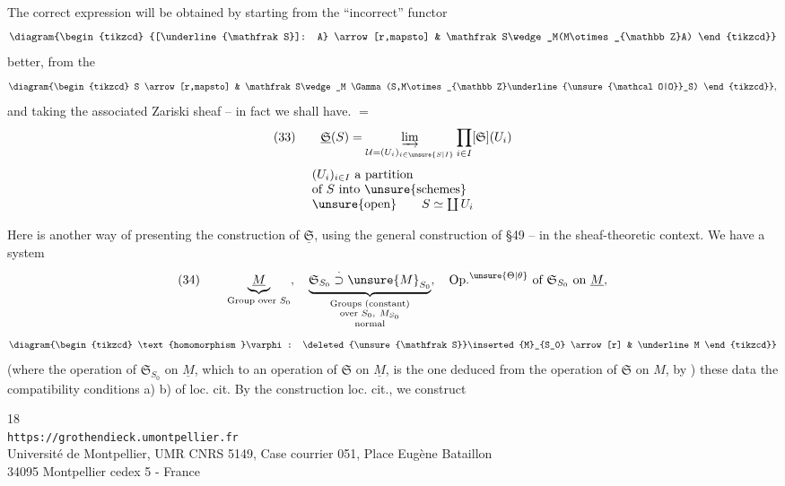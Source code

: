 The correct expression will be obtained by starting from the  ``incorrect'' functor
\[
\diagram{\begin{tikzcd}
{[\underline{\mathfrak S}]: A} \arrow[r,mapsto] &
\mathfrak S\wedge_M(M\otimes_{\mathbb Z}A)
\end{tikzcd}}
\]
 better, from the 
\[
\diagram{\begin{tikzcd}
S \arrow[r,mapsto] &
\mathfrak S\wedge_M
\Gamma(S,M\otimes_{\mathbb Z}\underline{\unsure{\mathcal O|O}}_S)
\end{tikzcd}},
\]
and taking the associated Zariski sheaf -- in fact we shall have. $=$
\[
(33)\qquad
\underline{\mathfrak S}(S)=
\underset{\mathcal U=(U_i)_{i\in\unsure{S|I}}}{\varinjlim}
\prod_{i\in I}[\mathfrak S](U_i)
\]
\[
\begin{array}{l}
(U_i)_{i\in I}\ \text{a partition}\\
\text{of }S\text{ into }\unsure{\text{schemes}}\\
\unsure{\text{open}}\qquad S\simeq\coprod U_i
\end{array}
\]

Here is another way of presenting the construction of
$\underline{\mathfrak S}$, using the general construction
of §49 -- in the sheaf-theoretic context. We have a system
\[
(34)\qquad
\underbrace{\underline M}_{\text{Group over }S_0},
\quad
\underbrace{\mathfrak S_{S_0}
\overset{\cdot}{\supset}\unsure{M}_{S_0}}_{
\substack{\text{Groups (constant)}\\
\text{over }S_0,\ M_{S_0}\\
\text{normal}}},
\quad
\mathrm{Op.}^{\unsure{\Theta|\theta}}\text{ of }
\mathfrak S_{S_0}\text{ on }\underline M,
\]
\[
\diagram{\begin{tikzcd}
\text{homomorphism }\varphi:
\deleted{\unsure{\mathfrak S}}\inserted{M}_{S_0}
\arrow[r] & \underline M
\end{tikzcd}}
\]
(where the operation of $\mathfrak S_{S_0}$ on $\underline M$,
which  to an operation of $\mathfrak S$ on $\underline M$,
is the one deduced from the operation of $\mathfrak S$ on $M$,
by )
these data  the compatibility conditions a) b)
of loc. cit. By the construction  loc. cit., we construct

\begin{center}
\small
18\\
\texttt{https://grothendieck.umontpellier.fr}\\
Université de Montpellier, UMR CNRS 5149, Case courrier 051, Place Eugène Bataillon\\
34095 Montpellier cedex 5 - France
\end{center}
